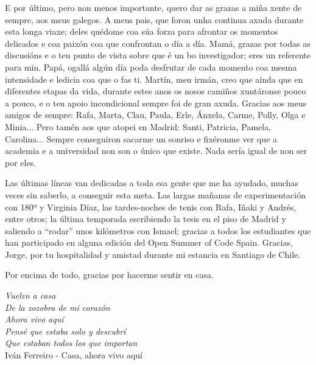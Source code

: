 \begin{acknowledgementslong}
E por último, pero non menos importante, quero dar as grazas  a miña xente de sempre, aos meus galegos. A meus pais, que foron unha continua axuda durante  esta longa viaxe; deles quédome coa súa forza para afrontar os momentos delicados e coa paixón coa que confrontan o día a día. Mamá, grazas por todas as discusións e o teu punto de vista sobre que é un bo investigador; eres un referente para min. Papá, ogallá algún día poda desfrutar de cada momento coa mesma intensidade e ledicia coa que o fas ti. Martín, meu irmán, creo que aínda que en diferentes etapas da vida, durante estes anos os nosos camiños xuntáronse pouco a pouco, e o teu apoio incondicional sempre foi de gran axuda. Gracias aos meus amigos de sempre: Rafa, Marta, Clau, Paula, Erle, Ánxela, Carme, Polly, Olga e Minia... Pero tamén aos que atopei en Madrid: Santi, Patricia, Pamela, Carolina... Sempre conseguiron sacarme un sonriso e fixéronme ver que a academia e a universidad non son o único que existe. Nada sería igual de non ser por eles.

Las últimas líneas van dedicadas a toda esa gente que me ha ayudado, muchas veces sin saberlo, a conseguir esta meta. Las largas mañanas de experimentación con 180º y Virginia Díaz, las tardes-noches de tenis con Rafa, Iñaki y Andrés, entre otros; la última temporada escribiendo la tesis en el piso de Madrid y saliendo a ``rodar'' unos kilómetros con Ismael; gracias a todos los estudiantes que han participado en alguna edición del Open Summer of Code Spain. Gracias, Jorge, por tu hospitalidad y amistad durante mi estancia en Santiago de Chile.

Por encima de todo, gracias por hacerme sentir en casa.

\vspace{10mm}

\textit{
\null\hfill Vuelvo a casa \\
\null\hfill De la zozobra de mi corazón \\
\null\hfill Ahora vivo aquí \\
\null\hfill Pensé que estaba solo y descubrí \\
\null\hfill Que estaban todos los que importan \vspace{6mm} \\
} 
\null\hfill Iván Ferreiro - Casa, ahora vivo aquí

\end{acknowledgementslong}









